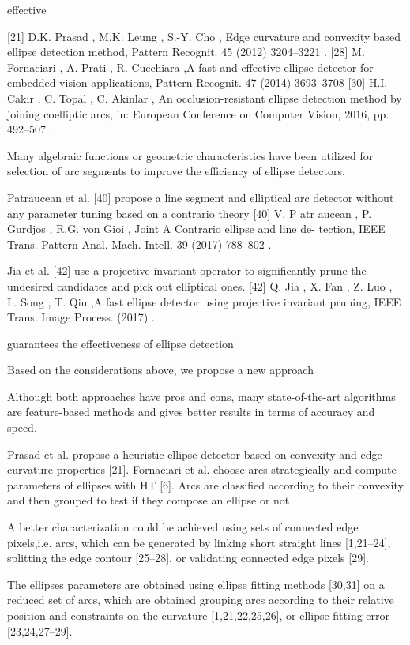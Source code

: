 \documentclass[a4paper]{report}
\begin{document}
effective

[21] D.K. Prasad , M.K. Leung , S.-Y. Cho , Edge curvature and convexity based ellipse detection method, Pattern Recognit. 45 (2012) 3204–3221 .
[28] M. Fornaciari , A. Prati , R. Cucchiara ,A fast and effective ellipse detector for embedded vision applications, Pattern Recognit. 47 (2014) 3693–3708
[30] H.I. Cakir , C. Topal , C. Akinlar , An occlusion-resistant ellipse detection method by joining coelliptic arcs, in: European Conference on Computer Vision, 2016, pp. 492–507 .


Many algebraic functions or geometric characteristics have been utilized for selection of arc segments to improve the efficiency of ellipse detectors.

Patraucean et al. [40] propose a line segment and elliptical arc detector without any parameter tuning based on a contrario theory
[40] V. P atr aucean , P. Gurdjos , R.G. von Gioi , Joint A Contrario ellipse and line de- tection, IEEE Trans. Pattern Anal. Mach. Intell. 39 (2017) 788–802 .

Jia et al. [42] use a projective invariant operator to significantly prune the undesired candidates and pick out elliptical ones. 
[42] Q. Jia , X. Fan , Z. Luo , L. Song , T. Qiu ,A fast ellipse detector using projective invariant pruning, IEEE Trans. Image Process. (2017) .

guarantees the effectiveness of ellipse detection

Based on the considerations above, we propose a new approach



Although both approaches have pros and cons, many state-of-the-art algorithms
are feature-based methods and gives better results in terms of accuracy and
speed.


Prasad et al. propose a heuristic ellipse detector based on convexity and edge curvature properties [21]. Fornaciari et al. choose arcs strategically and compute parameters of ellipses with HT [6]. Arcs are classified according to their convexity and then grouped to test if they compose an ellipse or not

A better characterization could be achieved using sets of
connected edge pixels,i.e. arcs, which can be generated by linking
short straight lines [1,21–24], splitting the edge contour [25–28],
or validating connected edge pixels [29].

The ellipses parameters
are obtained using ellipse fitting methods [30,31] on a reduced set
of arcs, which are obtained grouping arcs according to their
relative position and constraints on the curvature [1,21,22,25,26],
or ellipse fitting error [23,24,27–29].
\end{document}
